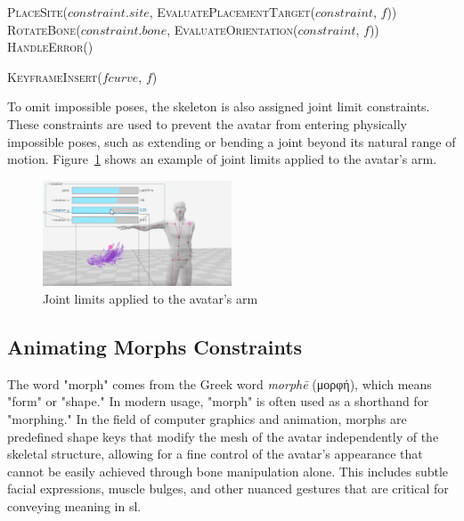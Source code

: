 \documentclass[../../main.tex]{subfiles}
\begin{document}
{\begin{algorithm}
\begin{algorithmic}[1]
                \State \textsc{PlaceSite}($constraint.site$, \textsc{EvaluatePlacementTarget}($constraint$, $f$))
                \State \textsc{RotateBone}($constraint.bone$, \textsc{EvaluateOrientation}($constraint$, $f$))
            \Else
                \State \textsc{HandleError}()
            \EndIf
        \EndProcedure
        
                \State \textsc{KeyframeInsert}($fcurve$, $f$)
            \EndFor
        \EndProcedure
    \end{algorithmic}
\end{algorithm}


To omit impossible poses, the skeleton is also assigned joint limit constraints. These constraints are used to prevent the avatar from entering physically impossible poses, such as extending or bending a joint beyond its natural range of motion. Figure~\ref{fig:joint_limits} shows an example of joint limits applied to the avatar's arm.

\begin{figure}
    \centering
    \includegraphics[width=0.5\textwidth]{chapters/avatar_creation_pose_synthesis/images/joint_limits.png}
    \caption{Joint limits applied to the avatar's arm}
    \label{fig:joint_limits}
\end{figure}

\subsection{Animating Morphs Constraints}
\label{ch:avatar_creation_pose_synthesis:proc_rig_signing_avatars:morph_constraints}

The word "morph" comes from the Greek word \textit{morphē} (\textgreek{μορφή}), which means "form" or "shape." In modern usage, "morph" is often used as a shorthand for "morphing." In the field of computer graphics and animation, morphs are predefined shape keys that modify the mesh of the avatar independently of the skeletal structure, allowing for a fine control of the avatar's appearance that cannot be easily achieved through bone manipulation alone. This includes subtle facial expressions, muscle bulges, and other nuanced gestures that are critical for conveying meaning in \gls{sl}.

}
\end{document}
